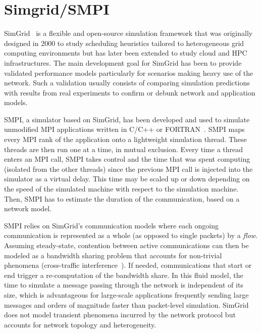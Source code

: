     \section{Simgrid/SMPI}%
    \label{sec:simgrid_smpi}

        SimGrid~\cite{simgrid} is a flexible and open-source simulation framework that was originally designed in 2000 to
        study scheduling heuristics tailored to heterogeneous grid computing environments but has later been extended to
        study cloud and HPC infrastructures. The main development goal for SimGrid has been to provide validated performance
        models particularly for scenarios making heavy use of the network.  Such a validation usually consists of comparing
        simulation predictions with results from real experiments to confirm or debunk network and application models.

        SMPI, a simulator based on SimGrid, has been developed and used to simulate unmodified MPI applications written
        in C/C++ or FORTRAN~\cite{smpi}.  SMPI maps every MPI rank of the application onto a lightweight simulation
        thread. These threads are then run one at a time, \ie in mutual exclusion.  Every time a thread enters an MPI
        call, SMPI takes control and the time that was spent computing (isolated from the other threads) since the
        previous MPI call is injected into the simulator as a virtual delay.  This time may be scaled up or down
        depending on the speed of the simulated machine with respect to the simulation machine. Then, SMPI has to
        estimate the duration of the communication, based on a network model.

        SMPI relies on SimGrid's communication models where each ongoing communication is represented as a whole (as
        opposed to single packets) by a \emph{flow}. Assuming steady-state, contention between active communications can
        then be modeled as a bandwidth sharing problem that accounts for non-trivial phenomena (\eg cross-traffic
        interference~\cite{Velho_TOMACS13}). If needed, communications that start or end trigger a re-computation of the
        bandwidth share.  In this fluid model, the time to simulate a message passing through the network is independent
        of its size, which is advantageous for large-scale applications frequently sending large messages and orders of
        magnitude faster than packet-level simulation.  SimGrid does not model transient phenomena incurred by the
        network protocol but accounts for network topology and heterogeneity.

